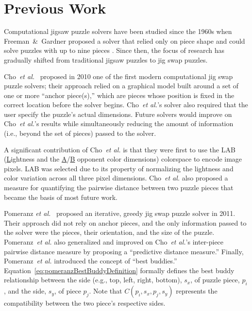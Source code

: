 \chapter{Previous Work}\label{chap:previousWork}

Computational jigsaw puzzle solvers have been studied since the 1960s when Freeman~\&~Gardner proposed a solver that relied only on piece shape and could solve puzzles with up to nine pieces \cite{freeman1964}.  Since then, the focus of research has gradually shifted from traditional jigsaw puzzles to jig swap puzzles.  

Cho~\textit{et al.}~\cite{cho2010} proposed in 2010 one of the first modern computational jig swap puzzle solvers; their approach relied on a graphical model built around a set of one or more ``anchor piece(s),'' which are pieces whose position is fixed in the correct location before the solver begins.  Cho~\textit{et al.}'s solver also required that the user specify the puzzle's actual dimensions.  Future solvers would improve on Cho~\textit{et al.}'s results while simultaneously reducing the amount of information (i.e., beyond the set of pieces) passed to the solver.

A significant contribution of Cho~\textit{et al.} is that they were first to use the LAB  (\underline{L}ightness and the \underline{A}/\underline{B} opponent color dimensions) colorspace to encode image pixels.  LAB was selected due to its property of normalizing the lightness and color variation across all three pixel dimensions.  Cho~\textit{et al.} also proposed a measure for quantifying the pairwise distance between two puzzle pieces that became the basis of most future work.  

Pomeranz \textit{et al.}~\cite{pomeranz2011} proposed an iterative, greedy jig swap puzzle solver in 2011.  Their approach did not rely on anchor pieces, and the only information passed to the solver were the pieces, their orientation, and the size of the puzzle.  Pomeranz~\textit{et al.} also generalized and improved on Cho~\textit{et al.}'s inter-piece pairwise distance measure by proposing a ``predictive distance measure.''  Finally, Pomeranz~\textit{et al.} introduced the concept of ``best buddies.'' Equation~\ref{eq:pomeranzBestBuddyDefinition} formally defines the best buddy relationship between the side (e.g., top, left, right, bottom), $s_x$, of puzzle piece, $p_i$, and the side, $s_y$, of piece $p_j$.  Note that $C(p_i, s_x, p_j, s_y)$ represents the compatibility between the two piece's respective sides.

